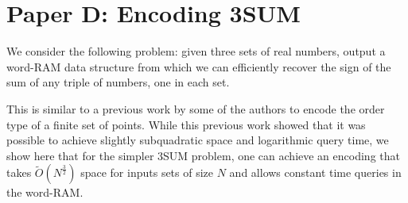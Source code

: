 \chapter{Paper D: Encoding 3SUM}
\label{chapter:3sum-encoding}

We consider the following problem: given three sets of real numbers, output a
word-RAM data structure from which we can efficiently recover the sign of the
sum of any triple of numbers, one in each set.

This is similar to a previous work by some of
the authors to encode the order type of a finite set of points. While this previous
work showed that it was possible to achieve slightly subquadratic space and
logarithmic query time, we show here that for the simpler 3SUM problem, one
can achieve an encoding that takes \(\tilde{O}(N^{\frac 32})\) space for inputs sets
of size \(N\) and allows constant time queries in the word-RAM.







